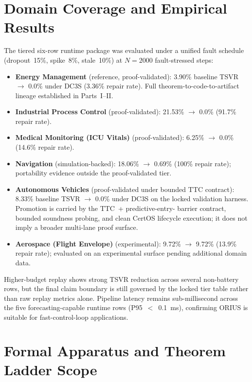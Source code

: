 \section{Domain Coverage and Empirical Results}

The tiered six-row runtime package was evaluated under a unified fault schedule
(dropout~15\%, spike~8\%, stale~10\%) at $N = 2000$ fault-stressed steps:

\begin{itemize}
  \item \textbf{Energy Management} (reference, proof-validated): 3.90\% baseline
    TSVR $\rightarrow$ 0.0\% under DC3S (3.36\% repair rate).
    Full theorem-to-code-to-artifact lineage established in Parts~I--II.
  \item \textbf{Industrial Process Control} (proof-validated): 21.53\% $\rightarrow$
    0.0\% (91.7\% repair rate).
  \item \textbf{Medical Monitoring (ICU Vitals)} (proof-validated): 6.25\%
    $\rightarrow$ 0.0\% (14.6\% repair rate).
  \item \textbf{Navigation} (simulation-backed): 18.06\% $\rightarrow$ 0.69\%
    (100\% repair rate); portability evidence outside the proof-validated tier.
  \item \textbf{Autonomous Vehicles} (proof-validated under bounded TTC contract):
    8.33\% baseline TSVR $\rightarrow$ 0.0\% under DC3S on the locked
    validation harness.  Promotion is carried by the TTC~+ predictive-entry-
    barrier contract, bounded soundness probing, and clean CertOS lifecycle
    execution; it does not imply a broader multi-lane proof surface.
  \item \textbf{Aerospace (Flight Envelope)} (experimental): 9.72\% $\rightarrow$
    9.72\% (13.9\% repair rate); evaluated on an experimental surface pending
    additional domain data.
\end{itemize}
Higher-budget replay shows strong TSVR reduction across several non-battery
rows, but the final claim boundary is still governed by the locked tier table
rather than raw replay metrics alone.  Pipeline latency remains
sub-millisecond across the five forecasting-capable runtime rows
(P95~$<$~0.1~ms), confirming ORIUS is suitable for fast-control-loop
applications.

\section{Formal Apparatus and Theorem Ladder Scope}

